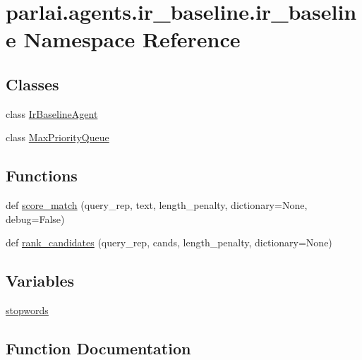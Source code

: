 \hypertarget{namespaceparlai_1_1agents_1_1ir__baseline_1_1ir__baseline}{}\section{parlai.\+agents.\+ir\+\_\+baseline.\+ir\+\_\+baseline Namespace Reference}
\label{namespaceparlai_1_1agents_1_1ir__baseline_1_1ir__baseline}
\subsection*{Classes}
\begin{DoxyCompactItemize}
\item 
class \hyperlink{classparlai_1_1agents_1_1ir__baseline_1_1ir__baseline_1_1IrBaselineAgent}{Ir\+Baseline\+Agent}
\item 
class \hyperlink{classparlai_1_1agents_1_1ir__baseline_1_1ir__baseline_1_1MaxPriorityQueue}{Max\+Priority\+Queue}
\end{DoxyCompactItemize}
\subsection*{Functions}
\begin{DoxyCompactItemize}
\item 
def \hyperlink{namespaceparlai_1_1agents_1_1ir__baseline_1_1ir__baseline_a64aaaccb38f5dd5f51c09439456b2f6e}{score\+\_\+match} (query\+\_\+rep, text, length\+\_\+penalty, dictionary=None, debug=False)
\item 
def \hyperlink{namespaceparlai_1_1agents_1_1ir__baseline_1_1ir__baseline_a995475fdd96a7bbd8886a3ebcfa56156}{rank\+\_\+candidates} (query\+\_\+rep, cands, length\+\_\+penalty, dictionary=None)
\end{DoxyCompactItemize}
\subsection*{Variables}
\begin{DoxyCompactItemize}
\item 
\hyperlink{namespaceparlai_1_1agents_1_1ir__baseline_1_1ir__baseline_a7e7907f0dfbd5f6c59bd56187a1b44df}{stopwords}
\end{DoxyCompactItemize}


\subsection{Function Documentation}
\mbox{\label{namespaceparlai_1_1agents_1_1ir__baseline_1_1ir__baseline_a995475fdd96a7bbd8886a3ebcfa56156}} 
